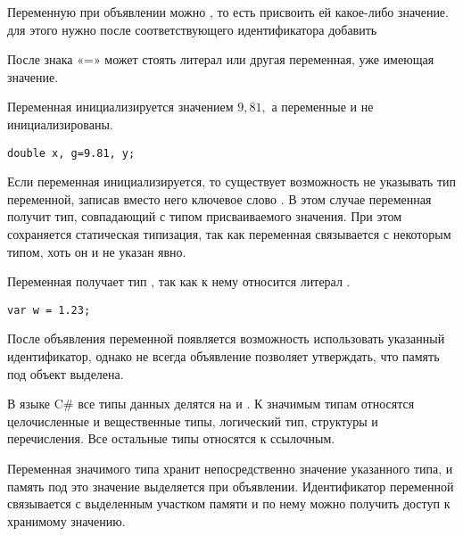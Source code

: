 
Переменную при объявлении можно
, то есть присвоить ей
какое-либо значение. для этого нужно после соответствующего
идентификатора добавить

\begin{center}
  \Lst{= }
\par\end{center}

После знака «=» может стоять литерал или другая переменная, уже имеющая
значение.

\begin{example}
  Переменная  инициализируется значением $9{,}81,$ а
  переменные  и  не инициализированы.

\begin{lstlisting}
double x, g=9.81, y;
\end{lstlisting}
\end{example}

Если переменная инициализируется, то существует возможность не
указывать тип переменной, записав вместо него ключевое слово
. В этом случае переменная получит тип, совпадающий с
типом присваиваемого значения. При этом сохраняется статическая
типизация, так как переменная связывается с некоторым типом, хоть он и
не указан явно.

\begin{example}
Переменная  получает тип , так как к нему
относится литерал .

\begin{lstlisting}
var w = 1.23;
\end{lstlisting}
\end{example}

После объявления переменной появляется возможность использовать
указанный идентификатор, однако не всегда объявление позволяет
утверждать, что память под объект выделена.


В языке C\# все типы данных делятся на  и .
К значимым типам относятся целочисленные и вещественные типы,
логический тип, структуры и перечисления. Все остальные типы относятся
к ссылочным.

Переменная значимого типа хранит непосредственно значение указанного
типа, и память под это значение выделяется при
объявлении. Идентификатор переменной связывается с выделенным участком
памяти и по нему можно получить доступ к хранимому значению.

